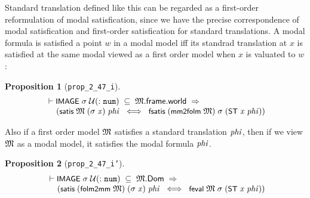 \documentclass[letterpaper]{article}
\newtheorem{prop}{Proposition}
\renewcommand{\HOLConst}[1]{{\textsf{\upshape\small #1}}}
\renewcommand{\HOLinline}[1]{\ensuremath{#1}}
\newenvironment{holmath}{\begin{displaymath}\begin{array}{l}}{\end{array}\end{displaymath}\ignorespacesafterend}
\begin{document}
Standard translation defined like this can be regarded as a first-order reformulation of modal satisfication, since we have the precise correspondence of modal satisfication and first-order satisfication for standard translations. A modal formula is satisfied a point $w$ in a modal model iff its standrad translation at $x$ is satisfied at the same modal viewed as a first order model when $x$ is valuated to $w$:
\begin{prop}[\texttt{prop_2_47_i}]
\begin{holmath}
  \ensuremath{\HOLTokenTurnstile}\HOLConst{IMAGE}\;\HOLFreeVar{\ensuremath{\sigma}}\;\ensuremath{\cal{U}}(:\HOLTyOp{num})\;\HOLSymConst{\HOLTokenSubset{}}\;\HOLFreeVar{\ensuremath{\mathfrak{M}}}.\HOLFieldName{frame}.\HOLFieldName{world}\;\HOLSymConst{\HOLTokenImp{}}\\
\;\;\;\;\;(\HOLConst{satis}\;\HOLFreeVar{\ensuremath{\mathfrak{M}}}\;(\HOLFreeVar{\ensuremath{\sigma}}\;\HOLFreeVar{x})\;\HOLFreeVar{phi}\;\HOLSymConst{\HOLTokenEquiv{}}\;\HOLConst{fsatis}\;(\HOLConst{mm2folm}\;\HOLFreeVar{\ensuremath{\mathfrak{M}}})\;\HOLFreeVar{\ensuremath{\sigma}}\;(\HOLConst{ST}\;\HOLFreeVar{x}\;\HOLFreeVar{phi}))
\end{holmath}
\end{prop} 

Also if a first order model \HOLinline{\HOLFreeVar{\ensuremath{\mathfrak{M}}}} satisfies a standard translation \HOLinline{\HOLFreeVar{phi}}, then if we view \HOLinline{\HOLFreeVar{\ensuremath{\mathfrak{M}}}} as a modal model, it satisfies the modal formula \HOLinline{\HOLFreeVar{phi}}.

\begin{prop}[\texttt{prop_2_47_i'}]
\begin{holmath}
  \ensuremath{\HOLTokenTurnstile}\HOLConst{IMAGE}\;\HOLFreeVar{\ensuremath{\sigma}}\;\ensuremath{\cal{U}}(:\HOLTyOp{num})\;\HOLSymConst{\HOLTokenSubset{}}\;\HOLFreeVar{\ensuremath{\mathfrak{M}}}.\HOLFieldName{Dom}\;\HOLSymConst{\HOLTokenImp{}}\\
\;\;\;\;\;(\HOLConst{satis}\;(\HOLConst{folm2mm}\;\HOLFreeVar{\ensuremath{\mathfrak{M}}})\;(\HOLFreeVar{\ensuremath{\sigma}}\;\HOLFreeVar{x})\;\HOLFreeVar{phi}\;\HOLSymConst{\HOLTokenEquiv{}}\;\HOLConst{feval}\;\HOLFreeVar{\ensuremath{\mathfrak{M}}}\;\HOLFreeVar{\ensuremath{\sigma}}\;(\HOLConst{ST}\;\HOLFreeVar{x}\;\HOLFreeVar{phi}))
\end{holmath}
\end{prop}
\end{document}
